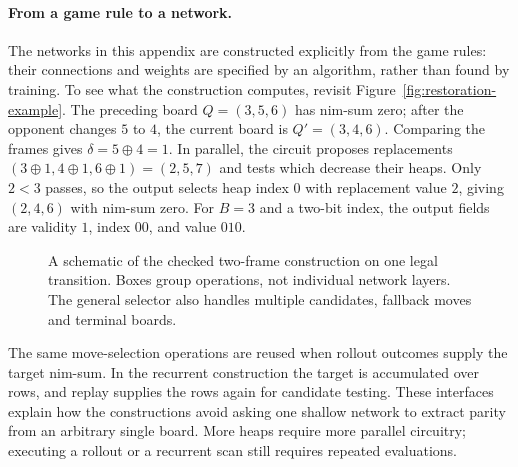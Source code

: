 \documentclass[twoside,11pt]{article}
\numberwithin{theorem}{section}
\numberwithin{equation}{section}
\begin{document}
\paragraph{From a game rule to a network.}
\label{par:construction-example}
The networks in this appendix are constructed explicitly from the game rules: their connections and weights are specified by an algorithm, rather than found by training. To see what the construction computes, revisit Figure~\ref{fig:restoration-example}. The preceding board $Q=(3,5,6)$ has nim-sum zero; after the opponent changes $5$ to $4$, the current board is $Q'=(3,4,6)$. Comparing the frames gives $\delta=5\oplus4=1$. In parallel, the circuit proposes replacements $(3\oplus1,4\oplus1,6\oplus1)=(2,5,7)$ and tests which decrease their heaps. Only $2<3$ passes, so the output selects heap index $0$ with replacement value $2$, giving $(2,4,6)$ with nim-sum zero. For $B=3$ and a two-bit index, the output fields are validity $1$, index $00$, and value $010$.

\begin{figure}[htbp]
\centering
{}
\caption{A schematic of the checked two-frame construction on one legal transition. Boxes group operations, not individual network layers. The general selector also handles multiple candidates, fallback moves and terminal boards.}
\label{fig:construction-pipeline}
\end{figure}

The same move-selection operations are reused when rollout outcomes supply the target nim-sum. In the recurrent construction the target is accumulated over rows, and replay supplies the rows again for candidate testing. These interfaces explain how the constructions avoid asking one shallow network to extract parity from an arbitrary single board. More heaps require more parallel circuitry; executing a rollout or a recurrent scan still requires repeated evaluations.
\end{document}
